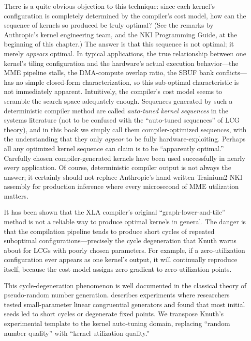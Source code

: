 \documentclass[12pt]{article}
\newcommand{\SBUF}{\textsc{SBUF}}                 %
\newcommand{\MME}{\textsc{MME}}                   %
\begin{document}
There is a quite obvious objection to this technique: since each kernel's configuration is completely determined by the compiler's cost model, how can the sequence of kernels so produced be truly optimal? (See the remarks by Anthropic's kernel engineering team, and the NKI Programming Guide, at the beginning of this chapter.) The answer is that this sequence is not optimal; it merely \emph{appears} optimal. In typical applications, the true relationship between one kernel's tiling configuration and the hardware's actual execution behavior---the \MME{} pipeline stalls, the DMA-compute overlap ratio, the \SBUF{} bank conflicts---has no simple closed-form characterization, so this sub-optimal characteristic is not immediately apparent. Intuitively, the compiler's cost model seems to scramble the search space adequately enough. Sequences generated by such a deterministic compiler method are called \emph{auto-tuned kernel sequences} in the systems literature (not to be confused with the ``auto-tuned sequences'' of LCG theory), and in this book we simply call them compiler-optimized sequences, with the understanding that they only \emph{appear} to be fully hardware-exploiting. Perhaps all any optimized kernel sequence can claim is to be ``apparently optimal.'' Carefully chosen compiler-generated kernels have been used successfully in nearly every application. Of course, deterministic compiler output is not always the answer; it certainly should not replace Anthropic's hand-written Trainium2 NKI assembly for production inference where every microsecond of \MME{} utilization matters.

It has been shown that the XLA compiler's original ``graph-lower-and-tile'' method is not a reliable way to produce optimal kernels in general. The danger is that the compilation pipeline tends to produce short cycles of repeated suboptimal configurations---precisely the cycle degeneration that Knuth warns about for LCGs with poorly chosen parameters. For example, if a zero-utilization configuration ever appears as one kernel's output, it will continually reproduce itself, because the cost model assigns zero gradient to zero-utilization points.

This cycle-degeneration phenomenon is well documented in the classical theory of pseudo-random number generation. \citet{knuth1997taocp2} describes experiments where researchers tested small-parameter linear congruential generators and found that most initial seeds led to short cycles or degenerate fixed points. We transpose Knuth's experimental template to the kernel auto-tuning domain, replacing ``random number quality'' with ``kernel utilization quality.''
\end{document}
